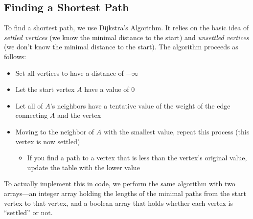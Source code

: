 \documentclass[class=article, crop=false]{standalone}
\begin{document}
  \subsection{Finding a Shortest Path}
  To find a shortest path, we use Dijkstra's Algorithm. It relies on the basic idea of \emph{settled vertices} (we know the minimal distance to the start) and \emph{unsettled vertices} (we don't know the minimal distance to the start). The algorithm proceeds as follows:
  \begin{itemize}
    \item Set all vertices to have a distance of $-\infty$
    \item Let the start vertex $A$ have a value of $0$
    \item Let all of $A$'s neighbors have a tentative value of the weight of the edge connecting $A$ and the vertex
    \item Moving to the neighbor of $A$ with the smallest value, repeat this process (this vertex is now settled)
    \begin{itemize}
      \item If you find a path to a vertex that is less than the vertex's original value, update the table with the lower value
    \end{itemize}
  \end{itemize}
  To actually implement this in code, we perform the same algorithm with two arrays---an integer array holding the lengths of the minimal paths from the start vertex to that vertex, and a boolean array that holds whether each vertex is ``settled'' or not.
\end{document}
